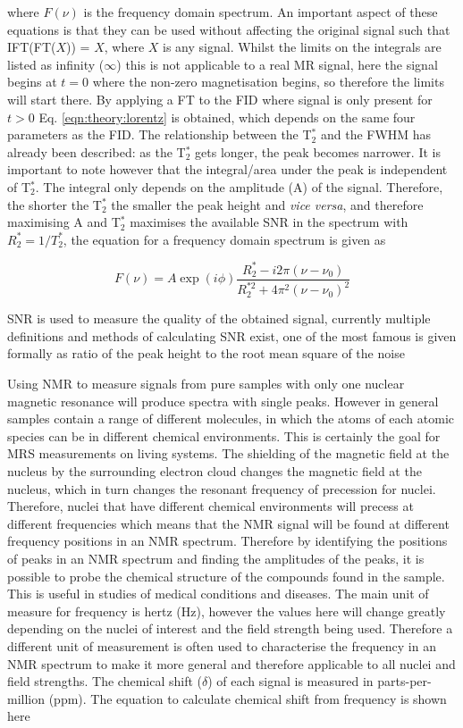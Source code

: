 \noindent where $F(\nu)$ is the frequency domain spectrum. An important aspect of these equations is that they can be used without affecting the original signal such that IFT(FT($X$)) = $X$, where $X$ is any signal. Whilst the limits on the integrals are listed as infinity ($\infty$) this is not applicable to a real MR signal, here the signal begins at $t=0$ where the non-zero magnetisation begins, so therefore the limits will start there. By applying a \ac{FT} to the \ac{FID} where signal is only present  for $t > 0$ Eq. \ref{eqn:theory:lorentz} is obtained, which depends on the same four parameters as the \ac{FID}. The relationship between the T$_2^*$ and the FWHM has already been described: as the T$_2^*$ gets longer, the peak becomes narrower. It is important to note however that the integral/area under the peak is independent of T$_2^*$. The integral only depends on the amplitude (A) of the signal. Therefore, the shorter the T$_2^*$ the smaller the peak height and \textit{vice versa}, and therefore maximising A and T$_2^*$ maximises the available \ac{SNR} in the spectrum with $R_2^* = 1/T_2^*$, the equation for a frequency domain spectrum is given as

\begin{equation}
    F(\nu) = A\exp(i\phi)\frac{R_2^*-i2\pi(\nu-\nu_0)}{R_2^{*2}+4\pi^2(\nu-\nu_0)^2}
    \label{eqn:theory:lorentz}
\end{equation}

\ac{SNR} is used to measure the quality of the obtained signal, currently multiple definitions and methods of calculating \ac{SNR} exist, one of the most famous is given formally as ratio of the peak height to the root mean square of the noise \cite{Ernst1987PrinciplesDimensions.} 

Using \ac{NMR} to measure signals from pure samples with only one nuclear magnetic resonance will produce spectra with single peaks. However in general samples contain a range of different molecules, in which the atoms of each atomic species can be in different chemical environments. This is certainly the goal for \ac{MRS} measurements on living systems. The shielding of the magnetic field at the nucleus by the surrounding electron cloud changes the magnetic field at the nucleus, which in turn changes the resonant frequency of precession for nuclei. Therefore, nuclei that have different chemical environments will precess at different frequencies which means that the \ac{NMR} signal will be found at different frequency positions in an \ac{NMR} spectrum. Therefore by identifying the positions of peaks in an \ac{NMR} spectrum and finding the amplitudes of the peaks, it is possible to probe the chemical structure of the compounds found in the sample. This is useful in studies of medical conditions and diseases. The main unit of measure for frequency is hertz (Hz), however the values here will change greatly depending on the nuclei of interest and the field strength being used. Therefore a different unit of measurement is often used to characterise the frequency in an \ac{NMR} spectrum to make it more general and therefore applicable to all nuclei and field strengths. The chemical shift ($\delta$) of each signal is measured in parts-per-million (ppm). The equation to calculate chemical shift from frequency is shown here

